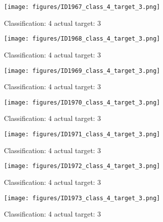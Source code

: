 \begin{figure}[h!]
\begin{center}
\texttt{[image: figures/ID1967\_class\_4\_target\_3.png]}
\end{center}
\caption{ Classification: 4 actual target: 3}
\label{fig:ID1967_class_4_target_3}
\end{figure}
\begin{figure}[h!]
\begin{center}
\texttt{[image: figures/ID1968\_class\_4\_target\_3.png]}
\end{center}
\caption{ Classification: 4 actual target: 3}
\label{fig:ID1968_class_4_target_3}
\end{figure}
\begin{figure}[h!]
\begin{center}
\texttt{[image: figures/ID1969\_class\_4\_target\_3.png]}
\end{center}
\caption{ Classification: 4 actual target: 3}
\label{fig:ID1969_class_4_target_3}
\end{figure}
\begin{figure}[h!]
\begin{center}
\texttt{[image: figures/ID1970\_class\_4\_target\_3.png]}
\end{center}
\caption{ Classification: 4 actual target: 3}
\label{fig:ID1970_class_4_target_3}
\end{figure}
\begin{figure}[h!]
\begin{center}
\texttt{[image: figures/ID1971\_class\_4\_target\_3.png]}
\end{center}
\caption{ Classification: 4 actual target: 3}
\label{fig:ID1971_class_4_target_3}
\end{figure}
\begin{figure}[h!]
\begin{center}
\texttt{[image: figures/ID1972\_class\_4\_target\_3.png]}
\end{center}
\caption{ Classification: 4 actual target: 3}
\label{fig:ID1972_class_4_target_3}
\end{figure}
\begin{figure}[h!]
\begin{center}
\texttt{[image: figures/ID1973\_class\_4\_target\_3.png]}
\end{center}
\caption{ Classification: 4 actual target: 3}
\label{fig:ID1973_class_4_target_3}
\end{figure}
